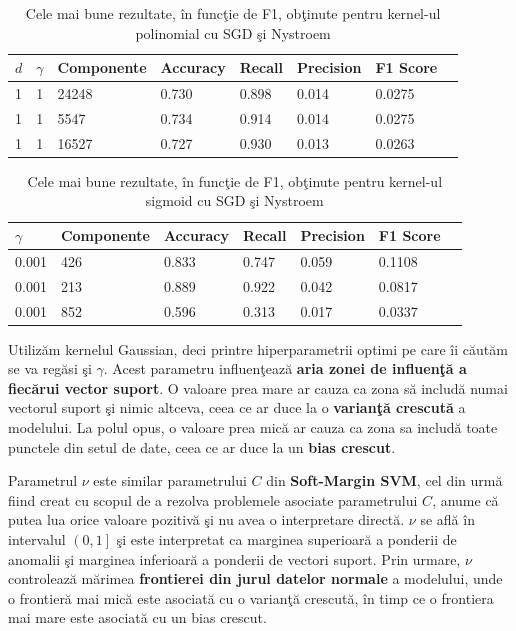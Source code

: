 \begin{table}[H]
    \centering
    \begin{tabularx}{\textwidth}{
        |X
        |X
        |X
        |X
        |X
        |X
        |X
        |X|
    }
    \hline
    $d$ & $\gamma$ & {Componente} & {Accuracy} & {Recall} & {Precision} & {F1 Score} \\
    \hline
    1 & 1 & 24248 & 0.730 & 0.898 & 0.014 & 0.0275 \\
    \rowcolor{gray!20} 1 &  1 & 5547 & 0.734	& 0.914	& 0.014	& 0.0275 \\ 
    1 & 1 & 16527 & 0.727 & 0.930 & 0.013 & 0.0263 \\ 
    \hline
  \end{tabularx}
  \caption{Cele mai bune rezultate, în funcţie de F1, obţinute pentru kernel-ul polinomial cu SGD şi Nystroem}
\end{table}

\begin{table}[H]
    \centering
    \begin{tabularx}{\textwidth}{
        |X
        |X
        |X
        |X
        |X
        |X
        |X|
    }
    \hline
    $\gamma$ & {Componente} & {Accuracy} & {Recall} & {Precision} & {F1 Score} \\
    \hline
     0.001 & 426 & 0.833 & 0.747 & 0.059 & 0.1108 \\
     \rowcolor{gray!20} 0.001 & 213 & 0.889 & 0.922 & 0.042	& 0.0817 \\
    0.001 & 852	& 0.596 & 0.313 & 0.017	& 0.0337 \\
    \hline
  \end{tabularx}
  \caption{Cele mai bune rezultate, în funcţie de F1, obţinute pentru kernel-ul sigmoid cu SGD şi Nystroem}
\end{table}

Utilizăm kernelul Gaussian, deci printre hiperparametrii optimi pe care îi căutăm 
se va regăsi şi $\gamma$. Acest parametru influenţează 
\textbf{aria zonei de influenţă a 
fiecărui vector suport}. O valoare prea mare ar cauza ca zona să includă numai 
vectorul suport şi nimic altceva, ceea ce ar duce la o \textbf{varianţă crescută} 
a modelului. La polul opus, o valoare prea mică ar cauza ca zona sa includă 
toate punctele din setul de date, ceea ce ar duce la un \textbf{bias crescut}.

Parametrul $\nu$ este similar parametrului $C$ din \textbf{Soft-Margin SVM}, 
cel din urmă
fiind creat cu scopul de a rezolva problemele asociate parametrului $C$, anume că 
putea lua orice valoare pozitivă şi nu avea o interpretare directă. $\nu$ se află 
în intervalul $\left(0, 1\right]$ şi este interpretat ca marginea superioară a ponderii de anomalii 
şi marginea inferioară a ponderii de vectori suport. Prin urmare, $\nu$ controlează
mărimea \textbf{frontierei din jurul datelor normale} a modelului, 
unde o frontieră mai mică este asociată
cu o varianţă crescută, în timp ce o frontiera mai mare este asociată cu un bias 
crescut.

